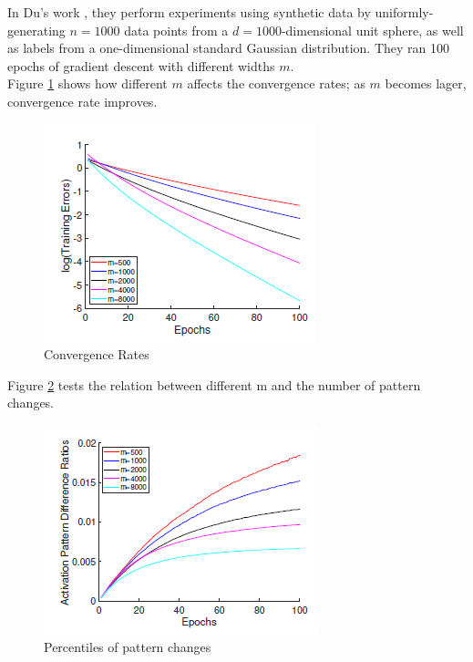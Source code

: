 \documentclass{article}
\begin{document}
In Du's work \cite{SimonDu}, they perform experiments using synthetic data by uniformly-generating $n = 1000$ data points from a $d = 1000$-dimensional unit sphere, as well as labels from a one-dimensional standard Gaussian distribution. 
They ran 100 epochs of gradient descent with different widths $m$. \\

\pagebreak
Figure \ref{fig:conver} shows how different $m$ affects the convergence rates; as $m$ becomes lager, convergence rate improves.

\begin{figure}[htb]
	\centering
    \includegraphics[scale= 0.5]{pics/overparameterization/ConvergeRate.PNG}
    \caption{Convergence Rates}
	\label{fig:conver}
\end{figure}

Figure \ref{fig:patternsample} tests the relation between different m and the number of pattern changes.

\begin{figure}[htb]
	\centering
    \includegraphics[scale= 0.5]{pics/overparameterization/PatternSample.PNG}
    \caption{Percentiles of pattern changes}
	\label{fig:patternsample}
\end{figure}
\end{document}
